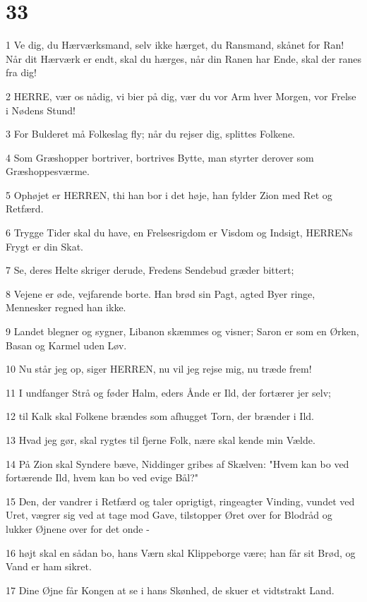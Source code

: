 \chapter{33}

\par 1 Ve dig, du Hærværksmand, selv ikke hærget, du Ransmand, skånet for Ran! Når dit Hærværk er endt, skal du hærges, når din Ranen har Ende, skal der ranes fra dig!
\par 2 HERRE, vær os nådig, vi bier på dig, vær du vor Arm hver Morgen, vor Frelse i Nødens Stund!
\par 3 For Bulderet må Folkeslag fly; når du rejser dig, splittes Folkene.
\par 4 Som Græshopper bortriver, bortrives Bytte, man styrter derover som Græshoppesværme.
\par 5 Ophøjet er HERREN, thi han bor i det høje, han fylder Zion med Ret og Retfærd.
\par 6 Trygge Tider skal du have, en Frelsesrigdom er Visdom og Indsigt, HERRENs Frygt er din Skat.
\par 7 Se, deres Helte skriger derude, Fredens Sendebud græder bittert;
\par 8 Vejene er øde, vejfarende borte. Han brød sin Pagt, agted Byer ringe, Mennesker regned han ikke.
\par 9 Landet blegner og sygner, Libanon skæmmes og visner; Saron er som en Ørken, Basan og Karmel uden Løv.
\par 10 Nu står jeg op, siger HERREN, nu vil jeg rejse mig, nu træde frem!
\par 11 I undfanger Strå og føder Halm, eders Ånde er Ild, der fortærer jer selv;
\par 12 til Kalk skal Folkene brændes som afhugget Torn, der brænder i Ild.
\par 13 Hvad jeg gør, skal rygtes til fjerne Folk, nære skal kende min Vælde.
\par 14 På Zion skal Syndere bæve, Niddinger gribes af Skælven: "Hvem kan bo ved fortærende Ild, hvem kan bo ved evige Bål?"
\par 15 Den, der vandrer i Retfærd og taler oprigtigt, ringeagter Vinding, vundet ved Uret, vægrer sig ved at tage mod Gave, tilstopper Øret over for Blodråd og lukker Øjnene over for det onde -
\par 16 højt skal en sådan bo, hans Værn skal Klippeborge være; han får sit Brød, og Vand er ham sikret.
\par 17 Dine Øjne får Kongen at se i hans Skønhed, de skuer et vidtstrakt Land.
